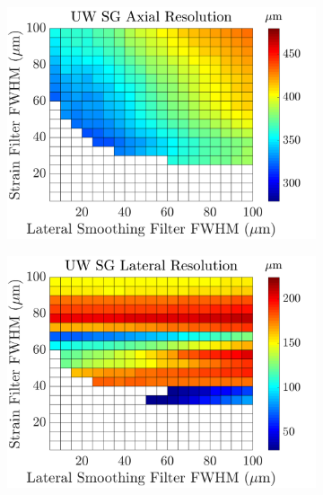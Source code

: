 \begin{figure}[h!]
\begin{subfigure}{0.49\textwidth}
		\includegraphics[width=\textwidth]{imageres_figs/uwsg_axial.png}
	\end{subfigure}
	\begin{subfigure}{0.49\textwidth}
		\centering
		\includegraphics[width=\textwidth]{imageres_figs/uwsg_lateral.png}
	\end{subfigure}
	\\
		\begin{subfigure}{0.49\textwidth}
		\centering

\end{subfigure}
\end{figure}
